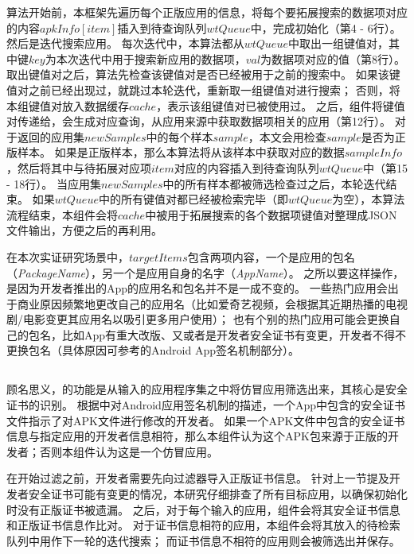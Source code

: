 算法开始前，本框架先遍历每个正版应用的信息，将每个要拓展搜索的数据项对应的内容$apkInfo[item]$插入到待查询队列$wtQueue$中，完成初始化（第4 - 6行）。
然后是迭代搜索应用。
每次迭代中，本算法都从$wtQueue$中取出一组键值对，其中键$key$为本次迭代中用于搜索新应用的数据项，$val$为数据项对应的值（第8行）。
取出键值对之后，算法先检查该键值对是否已经被用于之前的搜索中。
如果该键值对之前已经出现过，就跳过本轮迭代，重新取一组键值对进行搜索；
否则，将本组键值对放入数据缓存$cache$，表示该组键值对已被使用过。
之后，组件将键值对传递给\componentA ，\componentA 会生成对应查询，从应用来源中获取数据项相关的应用（第12行）。
对于\componentA 返回的应用集$newSamples$中的每个样本$sample$，本文会用\componentC 检查$sample$是否为正版样本。
如果是正版样本，那么本算法将从该样本中获取对应的数据$sampleInfo$，然后将其中与待拓展对应项$item$对应的内容插入到待查询队列$wtQueue$中（第15 - 18行）。
当应用集$newSamples$中的所有样本都被筛选检查过之后，本轮迭代结束。
如果$wtQueue$中的所有键值对都已经被检索完毕（即$wtQueue$为空），本算法流程结束，本组件会将$cache$中被用于拓展搜索的各个数据项键值对整理成JSON文件输出，方便之后的再利用。

在本次实证研究场景中，$targetItems$包含两项内容，一个是应用的包名（\emph{PackageName}），另一个是应用自身的名字（\emph{AppName}）。
之所以要这样操作，是因为开发者推出的App的应用名和包名并不是一成不变的。
一些热门应用会出于商业原因频繁地更改自己的应用名（比如爱奇艺视频，会根据其近期热播的电视剧/电影变更其应用名以吸引更多用户使用）；
也有个别的热门应用可能会更换自己的包名，比如App有重大改版、又或者是开发者安全证书有变更，开发者不得不更换包名（具体原因可参考的Android App签名机制部分）。

\subsection{\componentC }
顾名思义，\componentC 的功能是从输入的应用程序集之中将仿冒应用筛选出来，其核心是安全证书的识别。
根据中对Android应用签名机制的描述，一个App中包含的安全证书文件指示了对APK文件进行修改的开发者。
如果一个APK文件中包含的安全证书信息与指定应用的开发者信息相符，那么本组件认为这个APK包来源于正版的开发者；否则本组件认为这是一个仿冒应用。

在开始过滤之前，开发者需要先向过滤器导入正版证书信息。
针对上一节提及开发者安全证书可能有变更的情况，本研究仔细排查了所有目标应用，以确保初始化\mytool 时没有正版证书被遗漏。
之后，对于每个输入的应用，组件会将其安全证书信息和正版证书信息作比对。
对于证书信息相符的应用，本组件会将其放入\componentB 的待检索队列中用作下一轮的迭代搜索；
而证书信息不相符的应用则会被筛选出并保存。

